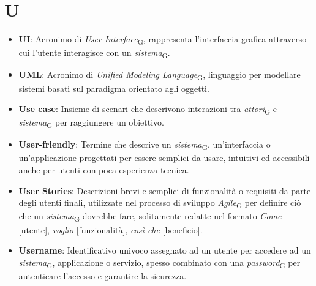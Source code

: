 \section{U}
\begin{itemize}
    \item \textbf{UI}: Acronimo di \textit{User Interface}\textsubscript{G}, rappresenta l'interfaccia grafica attraverso cui l'utente interagisce con un \textit{sistema}\textsubscript{G}.
    \item \textbf{UML}: Acronimo di \textit{Unified Modeling Language}\textsubscript{G}, linguaggio per modellare sistemi basati sul paradigma orientato agli oggetti.
    \item \textbf{Use case}: Insieme di scenari che descrivono interazioni tra \textit{attori}\textsubscript{G} e \textit{sistema}\textsubscript{G} per raggiungere un obiettivo.
    \item \textbf{User-friendly}: Termine che descrive un \textit{sistema}\textsubscript{G}, un'interfaccia o un'applicazione progettati per essere semplici da usare, intuitivi ed accessibili anche per utenti con poca esperienza tecnica.
    \item \textbf{User Stories}: Descrizioni brevi e semplici di funzionalità o requisiti da parte degli utenti finali, utilizzate nel processo di sviluppo \textit{Agile}\textsubscript{G} per definire ciò che un \textit{sistema}\textsubscript{G} dovrebbe fare, solitamente redatte nel formato \textit{Come} [utente], \textit{voglio} [funzionalità], \textit{così che} [beneficio].
    \item \textbf{Username}: Identificativo univoco assegnato ad un utente per accedere ad un \textit{sistema}\textsubscript{G}, applicazione o servizio, spesso combinato con una \textit{password}\textsubscript{G} per autenticare l'accesso e garantire la sicurezza.
\end{itemize}

